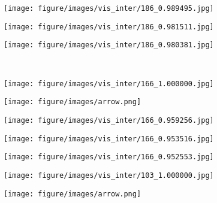 \begin{figure*}[t]
\begin{subfigure}[b]{.095\linewidth}
    \centering
    \texttt{[image: figure/images/vis\_inter/186\_0.989495.jpg]}
\end{subfigure} 
\begin{subfigure}[b]{.095\linewidth}
    \centering
    \texttt{[image: figure/images/vis\_inter/186\_0.981511.jpg]}
\end{subfigure} 
\begin{subfigure}[b]{.095\linewidth}
    \centering
    \texttt{[image: figure/images/vis\_inter/186\_0.980381.jpg]}
\end{subfigure} 
  \\%
  \begin{subfigure}[b]{.095\linewidth}
    \centering
    \texttt{[image: figure/images/vis\_inter/166\_1.000000.jpg]}
  \end{subfigure}\hspace{-1mm}
  \begin{subfigure}[b]{0.095\linewidth}
    \centering
    \texttt{[image: figure/images/arrow.png]}
  \end{subfigure} \hspace{-2mm} 
  \begin{subfigure}[b]{.095\linewidth}
    \centering
    \texttt{[image: figure/images/vis\_inter/166\_0.959256.jpg]}
  \end{subfigure}  
   \begin{subfigure}[b]{.095\linewidth}
    \centering
    \texttt{[image: figure/images/vis\_inter/166\_0.953516.jpg]}
  \end{subfigure} 
  \begin{subfigure}[b]{.095\linewidth}
    \centering
     \texttt{[image: figure/images/vis\_inter/166\_0.952553.jpg]}
  \end{subfigure} \hspace{5mm}
   \begin{subfigure}[b]{.095\linewidth}
    \centering
    \texttt{[image: figure/images/vis\_inter/103\_1.000000.jpg]}
  \end{subfigure}\hspace{-1mm} 
  \begin{subfigure}[b]{0.095\linewidth}
    \centering
    \texttt{[image: figure/images/arrow.png]}
  \end{subfigure}  \hspace{-2mm} 

\end{figure*}
